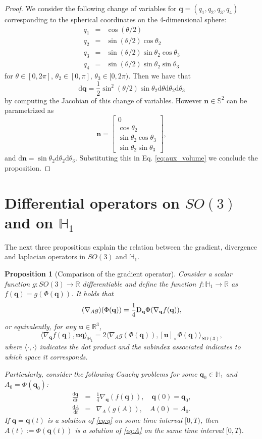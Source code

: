 \documentclass[12pt]{article}
\def\R{\mathbb{R}}
\def\to{\rightarrow}
\newtheorem{proposition}[theorem]{Proposition}
\newcommand{\beqar}{\begin{eqnarray*}}
\newcommand{\eeqar}{\end{eqnarray*}}
\newcommand{\beqarl}{\begin{eqnarray}}
\newcommand{\eeqarl}{\end{eqnarray}}
\newcommand{\be}{\begin{equation}}
\newcommand{\ee}{\end{equation}}
\newcommand{\nvec}{\mathbf{n}}
\newcommand{\uu}{\mathbf{u}}
\newcommand{\ud}{\mathrm{d}}
\newcommand{\unitq}{{\mathbb{H}_1}}
\newcommand{\q}{\mathbf{q}}
\begin{document}
\begin{proof}
 We consider the following change of variables for $\q=(q_1, q_2, q_3, q_4)$ corresponding to the spherical coordinates on the 4-dimensional sphere:
 \beqar
  q_1 &=& \cos (\theta/2)\\
  q_2 &=& \sin (\theta/2) \cos \theta_2\\
  q_3 &=& \sin(\theta/2) \sin \theta_2 \cos \theta_3\\
  q_4 &=& \sin (\theta/2) \sin \theta_2 \sin \theta_3
 \eeqar
 for $\theta \in [0,2\pi]$, $\theta_2 \in [0,\pi]$, $\theta_3 \in [0,2\pi)$. Then we have that
\be \label{eq:aux_volume} 
 \ud\q = \frac{1}{2}\sin^2(\theta/2) \sin \theta_2 \ud\theta \ud\theta_2 \ud\theta_3
 \ee
 by computing the Jacobian of this change of variables.
 However $\nvec \in \mathbb{S}^2$ can be parametrized as
 $$\nvec= \left[\begin{array}{l}
 0\\
 \cos\theta_2\\
 \sin\theta_2 \cos \theta_3\\
 \sin\theta_2 \sin \theta_3
 \end{array}\right],
 $$
and $\ud\nvec= \sin\theta_2 \ud\theta_2\ud\theta_3$. Substituting this in Eq. \eqref{eq:aux_volume} we conclude the proposition.
 
\end{proof}


\section{Differential operators on $SO(3)$ and on $\unitq$}\label{annex:Phi}

The next three propositions explain the relation between the gradient, divergence and laplacian operators in $SO(3)$ and $\unitq$. 

\begin{proposition} [Comparison of the gradient operator]
\label{lem:equivalent_equations}
Consider a scalar function $g: SO(3) \to \mathbb{R}$ differentiable and define the function $f: \unitq \to \mathbb{R}$ as $f(\q)= g(\Phi(\q))$. It holds that 
\be 
\label{eq:equivalence_gradients1}
(\nabla_A g) (\Phi(\q)) = \frac 14 \textnormal{D}_\q\Phi (\nabla_\q f (\q)),
\ee
or equivalently, for any $\uu\in \R^3$,
\be 
\label{eq:equivalence_gradients2}
\langle \nabla_\q f(\q), \uu\q\rangle_{\unitq}= 2\langle \nabla_A g(\Phi(\q)), [\uu]_\times \Phi(\q)\rangle_{SO(3)},
\ee
where $\langle\cdot, \cdot \rangle$ indicates the dot product and the subindex associated indicates to which space it corresponds.

Particularly, consider the following Cauchy problems for some $\q_0\in \unitq$ and $A_0=\Phi(\q_0)$:
\beqarl
\frac{\ud\q}{\ud t}&=& \frac{1}{4}\nabla_\q(f(\q)), \quad \q(0)=\q_0, \label{eq:q}\\
\frac{\ud A}{\ud t}&=& \nabla_A (g(A)), \quad A(0)=A_0. \label{eq:A}
\eeqarl
If $\q=\q(t)$ is a solution of \eqref{eq:q} on some time interval $[0,T)$, then  
$A(t):=\Phi(\q(t))$ is a solution of \eqref{eq:A} on the same time interval $[0,T)$.
\end{proposition}
\end{document}

